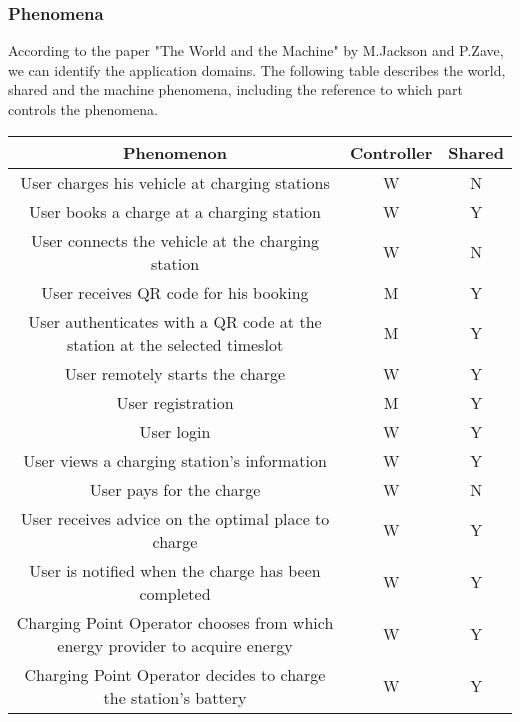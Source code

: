 \subsubsection{Phenomena}
According to the paper "The World and the Machine" by M.Jackson and P.Zave, 
we can identify the application domains. 
The following table describes the world, shared and the machine phenomena, 
including the reference to which part controls the phenomena.
\begin{table}[!h]
        \centering
        \begin{tabular}{|c|c|c|}
        \hline
        \textbf{Phenomenon}                                        & \textbf{Controller} & \textbf{Shared} \\ \hline
        User charges his vehicle at charging stations  & W          & N      \\ \hline
        User books a charge at a charging station         & W          & Y      \\ \hline
        User connects the vehicle at the charging station              & W          & N      \\ \hline
        User receives QR code for his booking      & M          & Y      \\ \hline
        User authenticates with a QR code at the station at the selected timeslot      & M          & Y      \\ \hline
        User remotely starts the charge                   & W          & Y      \\ \hline       
        User registration                                 & M          & Y      \\ \hline
        User login                                        & W          & Y      \\ \hline
        User views a charging station's information       & W          & Y      \\ \hline
        User pays for the charge                          & W          & N      \\ \hline
        User receives advice on the optimal place to charge            & W          & Y      \\ \hline
        User is notified when the charge has been completed   & W          & Y      \\ \hline
        Charging Point Operator chooses from which energy provider to acquire energy   & W          & Y      \\ \hline
        Charging Point Operator decides to charge the station's battery    & W          & Y      \\ \hline
        
       \end{tabular}
\end{table}

